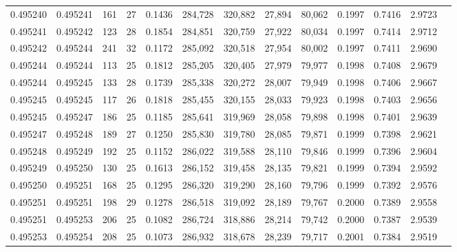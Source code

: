 \begin{tabular}{rrrrrrrrrrrrr}
0.495240 & 0.495241 & 161 &  27 &                                     0.1436 & 284,728 & 320,882 &  27,894 &  80,062 & 0.1997 & 0.7416 & 2.9723 \\
0.495241 & 0.495242 & 123 &  28 &                                     0.1854 & 284,851 & 320,759 &  27,922 &  80,034 & 0.1997 & 0.7414 & 2.9712 \\
0.495242 & 0.495244 & 241 &  32 &                                     0.1172 & 285,092 & 320,518 &  27,954 &  80,002 & 0.1997 & 0.7411 & 2.9690 \\
0.495244 & 0.495244 & 113 &  25 &                                     0.1812 & 285,205 & 320,405 &  27,979 &  79,977 & 0.1998 & 0.7408 & 2.9679 \\
0.495244 & 0.495245 & 133 &  28 &                                     0.1739 & 285,338 & 320,272 &  28,007 &  79,949 & 0.1998 & 0.7406 & 2.9667 \\
0.495245 & 0.495245 & 117 &  26 &                                     0.1818 & 285,455 & 320,155 &  28,033 &  79,923 & 0.1998 & 0.7403 & 2.9656 \\
0.495245 & 0.495247 & 186 &  25 &                                     0.1185 & 285,641 & 319,969 &  28,058 &  79,898 & 0.1998 & 0.7401 & 2.9639 \\
0.495247 & 0.495248 & 189 &  27 &                                     0.1250 & 285,830 & 319,780 &  28,085 &  79,871 & 0.1999 & 0.7398 & 2.9621 \\
0.495248 & 0.495249 & 192 &  25 &                                     0.1152 & 286,022 & 319,588 &  28,110 &  79,846 & 0.1999 & 0.7396 & 2.9604 \\
0.495249 & 0.495250 & 130 &  25 &                                     0.1613 & 286,152 & 319,458 &  28,135 &  79,821 & 0.1999 & 0.7394 & 2.9592 \\
0.495250 & 0.495251 & 168 &  25 &                                     0.1295 & 286,320 & 319,290 &  28,160 &  79,796 & 0.1999 & 0.7392 & 2.9576 \\
0.495251 & 0.495251 & 198 &  29 &                                     0.1278 & 286,518 & 319,092 &  28,189 &  79,767 & 0.2000 & 0.7389 & 2.9558 \\
0.495251 & 0.495253 & 206 &  25 &                                     0.1082 & 286,724 & 318,886 &  28,214 &  79,742 & 0.2000 & 0.7387 & 2.9539 \\
0.495253 & 0.495254 & 208 &  25 &                                     0.1073 & 286,932 & 318,678 &  28,239 &  79,717 & 0.2001 & 0.7384 & 2.9519 \\

\end{tabular}
